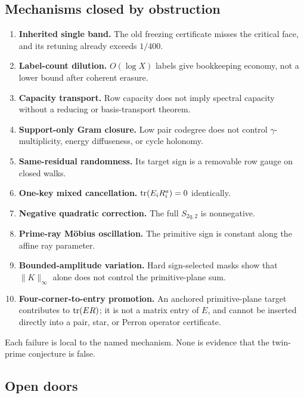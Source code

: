 \subsection{Mechanisms closed by obstruction}

\begin{enumerate}[label=\textup{(F\arabic*)},leftmargin=3.5em]
 \item \textbf{Inherited single band.}
       The old freezing certificate misses the critical face, and its
       retuning already exceeds \(1/400\).
 \item \textbf{Label-count dilution.}
       \(O(\log X)\) labels give bookkeeping economy, not a lower bound after
       coherent erasure.
 \item \textbf{Capacity transport.}
       Row capacity does not imply spectral capacity without a reducing or
       basis-transport theorem.
 \item \textbf{Support-only Gram closure.}
       Low pair codegree does not control \(\gamma\)-multiplicity, energy
       diffuseness, or cycle holonomy.
 \item \textbf{Same-residual randomness.}
       Its target sign is a removable row gauge on closed walks.
 \item \textbf{One-key mixed cancellation.}
       \(\operatorname{tr}(E_iR_i^a)=0\) identically.
 \item \textbf{Negative quadratic correction.}
       The full \(S_{2q,2}\) is nonnegative.
 \item \textbf{Prime-ray M\"obius oscillation.}
       The primitive sign is constant along the affine ray parameter.
 \item \textbf{Bounded-amplitude variation.}
       Hard sign-selected masks show that \(\|K\|_\infty\) alone does not
       control the primitive-plane sum.
 \item \textbf{Four-corner-to-entry promotion.}
       An anchored primitive-plane target contributes to \(\operatorname{tr}(ER)\); it is
       not a matrix entry of \(E\), and cannot be inserted directly into a
       pair, star, or Perron operator certificate.
\end{enumerate}

Each failure is local to the named mechanism.  None is evidence that the
twin-prime conjecture is false.

\subsection{Open doors}

